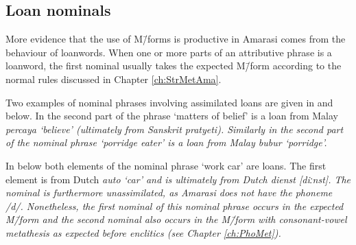 \subsection{Loan nominals}\label{sec:LoaNou}
More evidence that the use of M\=/forms is productive in Amarasi
comes from the behaviour of loanwords.
When one or more parts of an attributive phrase is a loanword,
the first nominal usually takes the expected M\=/form according
to the normal rules discussed in Chapter \ref{ch:StrMetAma}.

Two examples of nominal phrases involving assimilated loans
are given in  and  below.
In  the second part of the phrase  `matters of belief'
is a loan from Malay \it{percaya} `believe' (ultimately from Sanskrit \it{pratyeti}).
Similarly in  the second part of the nominal phrase 
`porridge eater' is a loan from Malay \it{bubur} `porridge'.

\begin{exe}
	\label{ex:130921-1, 1.35}
	\label{ex:130825-6, 17.02}
\end{exe}

In  below both elements of the nominal phrase  `work car'
are loans. The first element  is from Dutch \it{auto} `car'
and  is ultimately from Dutch \it{dienst} [diːnst].
The nominal  is furthermore unassimilated,
as Amarasi does not have the phoneme /d/.
Nonetheless, the first nominal of this nominal phrase occurs in the expected M\=/form
and the second nominal also occurs in the M\=/form 
with consonant-vowel metathesis as expected before enclitics (see Chapter \ref{ch:PhoMet}).

